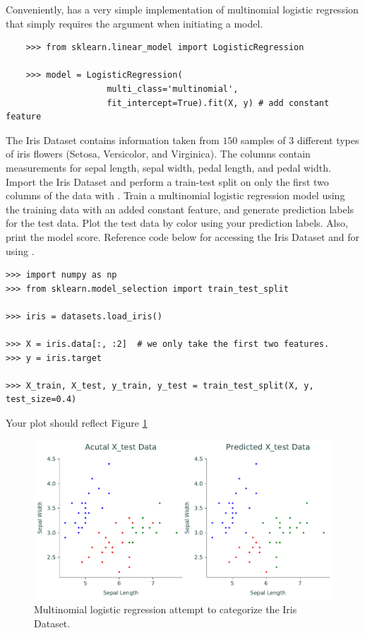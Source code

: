 Conveniently,  has a very simple implementation of multinomial logistic regression that simply requires the argument  when initiating a  model.
\begin{lstlisting}
    >>> from sklearn.linear_model import LogisticRegression

    >>> model = LogisticRegression(
                    multi_class='multinomial',
                    fit_intercept=True).fit(X, y) # add constant feature
\end{lstlisting}


\begin{problem}
    The Iris Dataset contains information taken from $150$ samples of $3$ different types of iris flowers (Setosa, Versicolor, and Virginica).
    The columns contain measurements for sepal length, sepal width, pedal length, and pedal width.
    Import the Iris Dataset and perform a train-test split on only the first two columns of the data with .
    Train a multinomial logistic regression model using the training data with an added constant feature, and generate prediction labels for the test data.
    Plot the test data by color using your prediction labels. Also, print the model score.
    Reference code below for accessing the Iris Dataset and for using .
\begin{lstlisting}
>>> import numpy as np
>>> from sklearn.model_selection import train_test_split

>>> iris = datasets.load_iris()

>>> X = iris.data[:, :2]  # we only take the first two features.
>>> y = iris.target

>>> X_train, X_test, y_train, y_test = train_test_split(X, y, test_size=0.4)
\end{lstlisting}
    Your plot should reflect Figure \ref{fig:iris}
\end{problem}

\begin{figure}[H]
    \includegraphics[width=.9\textwidth]{figures/plot_iris.pdf}
    \caption{Multinomial logistic regression attempt to categorize the Iris Dataset.}
    \label{fig:iris}
\end{figure}
